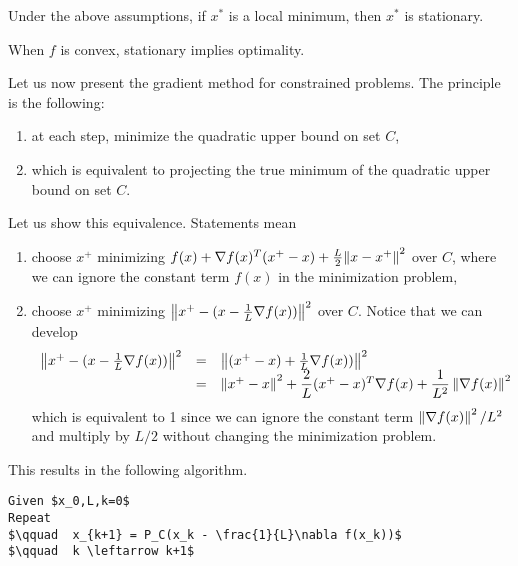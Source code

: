 \begin{theorem}
Under the above assumptions, if $x^*$ is a local minimum, then $x^*$ is stationary.
\end{theorem}

\begin{theorem}
When $f$ is convex, stationary implies optimality.
\end{theorem}

Let us now present the gradient method for constrained problems. The principle is the following:
\begin{enumerate}
\item at each step, minimize the quadratic upper bound on set $C$,
\item which is equivalent to projecting the true minimum of the quadratic upper bound on set $C$.
\end{enumerate}
Let us show this equivalence. Statements mean
\begin{enumerate}
\item choose $x^+$ minimizing $f(x) + \nabla f(x)^T(x^+-x) + \frac{L}{2}{\left\Vert x-x^+ \right\Vert}^2$ over $C$, where we can ignore the constant term $f(x)$ in the minimization problem,
\item choose $x^+$ minimizing ${\left\Vert x^+ - (x - \frac{1}{L}\nabla f(x)) \right\Vert^2}$ over $C$. Notice that we can develop
\begin{equation*}
\begin{array}{rcl}
\left\Vert x^+ - (x - \frac{1}{L}\nabla f(x)) \right\Vert^2 & = & \left\Vert (x^+ - x) + \frac{1}{L}\nabla f(x)) \right\Vert^2 \\
& = & \left\Vert x^+-x \right\Vert^2 + \dfrac{2}{L}(x^+-x)^T \nabla f(x) + \dfrac{1}{L^2} \left\Vert \nabla f(x) \right\Vert^2
\end{array}
\end{equation*}
which is equivalent to 1 since we can ignore the constant term $\left\Vert \nabla f(x) \right\Vert^2/L^2$ and multiply by $L/2$ without changing the minimization problem.
\end{enumerate}

This results in the following algorithm.

\begin{lstlisting}[mathescape,caption=Projected gradient method]
Given $x_0,L,k=0$ 
Repeat
$\qquad  x_{k+1} = P_C(x_k - \frac{1}{L}\nabla f(x_k))$
$\qquad  k \leftarrow k+1$
\end{lstlisting}


% 

